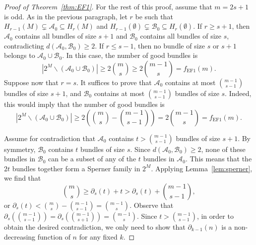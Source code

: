 \documentclass[11pt]{scrartcl}
\theoremstyle{definition}
\begin{document}
\begin{proof}[Proof of Theorem~\ref{thm:EF1}]
For the rest of this proof, assume that $m=2s+1$ is odd.
As in the previous paragraph, let $r$ be such that $H_{r-1}(M)\subsetneq\mathcal{A}_0\subseteq H_r(M)$ and $H_{r-1}(\emptyset)\subsetneq\mathcal{B}_0\subseteq H_r(\emptyset)$.
If $r\geq s+1$, then $\mathcal{A}_0$ contains all bundles of size $s+1$ and $\mathcal{B}_0$ contains all bundles of size $s$, contradicting $d(\mathcal{A}_0,\mathcal{B}_0)\geq 2$.
If $r\leq s-1$, then no bundle of size $s$ or $s+1$ belongs to $\mathcal{A}_0\cup\mathcal{B}_0$.
In this case, the number of good bundles is 
$$
|2^M\backslash(\mathcal{A}_0\cup\mathcal{B}_0)|
\geq
2\binom{m}{s}
\geq
2\binom{m-1}{s}
= f_{\text{EF1}}(m).
$$
Suppose now that $r=s$.
It suffices to prove that $\mathcal{A}_0$ contains at most $\binom{m-1}{s-1}$ bundles of size $s+1$, and $\mathcal{B}_0$ contains at most $\binom{m-1}{s-1}$ bundles of size $s$.
Indeed, this would imply that the number of good bundles is 
$$
|2^M\backslash(\mathcal{A}_0\cup\mathcal{B}_0)|
\geq
2\left(\binom{m}{s} - \binom{m-1}{s-1}\right)
=
2\binom{m-1}{s}
= f_{\text{EF1}}(m).
$$

Assume for contradiction that $\mathcal{A}_0$ contains $t > \binom{m-1}{s-1}$ bundles of size $s+1$.
By symmetry, $\mathcal{B}_0$ contains $t$ bundles of size $s$.
Since $d(\mathcal{A}_0,\mathcal{B}_0)\geq 2$, none of these bundles in $\mathcal{B}_0$ can be a subset of any of the $t$ bundles in $\mathcal{A}_0$.
This means that the $2t$ bundles together form a Sperner family in $2^M$.
Applying Lemma~\ref{lem:sperner}, we find that
$$\binom{m}{s}\geq \partial_s(t) + t > \partial_s(t) + \binom{m-1}{s-1},$$
or $\partial_s(t) < \binom{m}{s} - \binom{m-1}{s-1} =  \binom{m-1}{s}$.
Observe that $\partial_s\left(\binom{m-1}{s-1}\right) = \partial_s\left(\binom{m-1}{s+1}\right) = \binom{m-1}{s}$.
Since $t > \binom{m-1}{s-1}$, in order to obtain the desired contradiction, we only need to show that $\partial_{k-1}(n)$ is a non-decreasing function of $n$ for any fixed $k$.


\end{proof}
\end{document}
